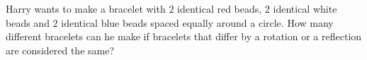 Harry wants to make a bracelet with $2$ identical red beads, $2$ identical white beads and $2$ identical blue beads spaced equally around a circle. How many different bracelets can he make if bracelets that differ by a rotation or a reflection are considered the same?

